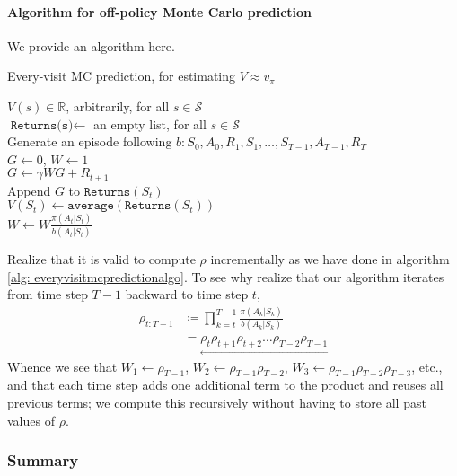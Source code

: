 \documentclass[12pt]{article}
\begin{document}
\paragraph{Algorithm for off-policy Monte Carlo prediction} We provide an algorithm here.
\begin{algorithm}[h]
  \caption{Every-visit MC prediction, for estimating $V \approx v_\pi$}
  $V(s) \in \mathbb R$, arbitrarily, for all $s \in \mathcal S$ \\
  $\texttt{Returns(s)} \gets $ an empty list, for all $s \in \mathcal S$ \\
   {
    Generate an episode following $b: S_0, A_0, R_1, S_1, \ldots, S_{T-1},     A_{T-1}, R_T$ \\
$G \gets 0$, $W \gets 1$ \\
     {
      $G \gets \gamma WG + R_{t+1}$ \\
      Append $G$ to $\texttt{Returns}(S_t)$ \\
      $V(S_t) \gets \texttt{average}(\texttt{Returns}(S_t))$ \\
      $W \gets W \frac{\pi(A_t|S_t)}{b(A_t|S_t)}$
    }
  }
  \label{alg: everyvisitmcpredictionalgo}
\end{algorithm}

Realize that it is valid to compute $\rho$ incrementally as we have done in algorithm \ref{alg: everyvisitmcpredictionalgo}. To see why realize that our algorithm iterates from time step $T-1$ backward to time step $t$,
\begin{align*}
  \rho_{t:T-1} &\coloneqq \prod_{k=t}^{T-1} \frac{\pi(A_k|S_k)}{b(A_k|S_k)} \\
               &= \underset{\longleftarrow}{\rho_t \rho_{t+1} \rho_{t+2} \ldots \rho_{T-2} \rho_{T-1}}
\end{align*}
Whence we see that $W_1 \gets \rho_{T-1}$, $W_2 \gets \rho_{T-1} \rho_{T-2}$, $W_3 \gets \rho_{T-1} \rho_{T-2} \rho_{T-3}$, etc., and that each time step adds one additional term to the product and reuses all previous terms; we compute this recursively without having to store all past values of $\rho$.

\subsubsection{Summary}
\end{document}
